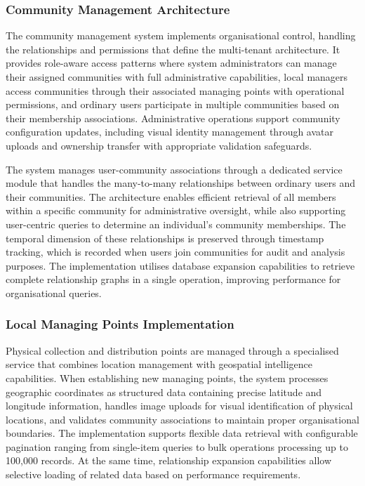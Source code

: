\subsubsection{Community Management Architecture}

The community management system implements organisational control, handling the relationships and permissions that define the multi-tenant architecture. It provides role-aware access patterns where system administrators can manage their assigned communities with full administrative capabilities, local managers access communities through their associated managing points with operational permissions, and ordinary users participate in multiple communities based on their membership associations. Administrative operations support community configuration updates, including visual identity management through avatar uploads and ownership transfer with appropriate validation safeguards.

The system manages user-community associations through a dedicated service module that handles the many-to-many relationships between ordinary users and their communities. The architecture enables efficient retrieval of all members within a specific community for administrative oversight, while also supporting user-centric queries to determine an individual's community memberships. The temporal dimension of these relationships is preserved through timestamp tracking, which is recorded when users join communities for audit and analysis purposes. The implementation utilises database expansion capabilities to retrieve complete relationship graphs in a single operation, improving performance for organisational queries.

\subsubsection{Local Managing Points Implementation}

Physical collection and distribution points are managed through a specialised service that combines location management with geospatial intelligence capabilities. When establishing new managing points, the system processes geographic coordinates as structured data containing precise latitude and longitude information, handles image uploads for visual identification of physical locations, and validates community associations to maintain proper organisational boundaries. The implementation supports flexible data retrieval with configurable pagination ranging from single-item queries to bulk operations processing up to 100,000 records. At the same time, relationship expansion capabilities allow selective loading of related data based on performance requirements.

